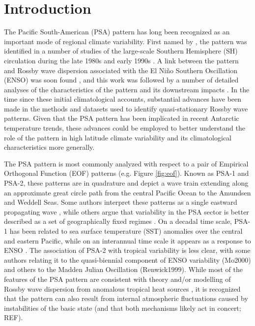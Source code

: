 \section{Introduction}

The Pacific South-American (PSA) pattern has long been recognized as an important mode of regional climate variability. First named by \citet{Mo1987}, the pattern was identified in a number of studies of the large-scale Southern Hemisphere (SH) circulation during the late 1980s and early 1990s \citep[e.g.][]{Lau1994}. A link between the pattern and Rossby wave dispersion associated with the El Ni\~{n}o Southern Oscillation (ENSO) was soon found \citep[e.g.][]{Karoly1989}, and this work was followed by a number of detailed analyses of the characteristics of the pattern and its downstream impacts \citep[e.g.][]{Mo1998,Mo2000,Mo2001}. In the time since these initial climatological accounts, substantial advances have been made in the methods and datasets used to identify quasi-stationary Rossby wave patterns. Given that the PSA pattern has been implicated in recent Antarctic temperature trends, these advances could be employed to better understand the role of the pattern in high latitude climate variability and its climatological characteristics more generally.

The PSA pattern is most commonly analyzed with respect to a pair of Empirical Orthogonal Function (EOF) patterns (e.g. Figure \ref{fig:eof}). Known as PSA-1 and PSA-2, these patterns are in quadrature and depict a wave train extending along an approximate great circle path from the central Pacific Ocean to the Amundsen and Weddell Seas. Some authors interpret these patterns as a single eastward propagating wave \citep{Mo1998}, while others argue that variability in the PSA sector is better described as a set of geographically fixed regimes \citep{Robertson2003}. On a decadal time scale, PSA-1 has been related to sea surface temperature (SST) anomalies over the central and eastern Pacific, while on an interannual time scale it appears as a response to ENSO \citep{Mo2001}. The association of PSA-2 with tropical variability is less clear, with some authors relating it to the quasi-biennial component of ENSO variability (Mo2000) and others to the Madden Julian Oscillation (Renwick1999). While most of the features of the PSA pattern are consistent with theory and/or modelling of Rossby wave dispersion from anomalous tropical heat sources \citep[e.g.][]{Liu2007,Li2015}, it is recognized that the pattern can also result from internal atmospheric fluctuations caused by instabilities of the basic state (and that both mechanisms likely act in concert; REF).


